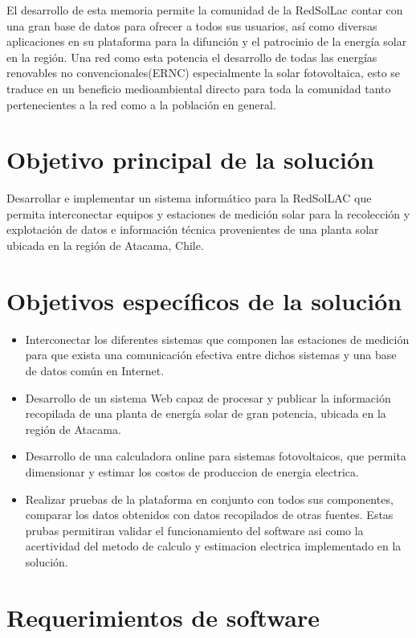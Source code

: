 El desarrollo de esta memoria permite la comunidad de la RedSolLac contar con una gran base de datos para ofrecer a todos sus usuarios, así como diversas aplicaciones en su plataforma para la difunción y el patrocinio de la energía solar en la región. Una red como esta potencia el desarrollo de todas las energías renovables no convencionales(ERNC) especialmente la solar fotovoltaica, esto se traduce en un beneficio medioambiental directo para toda la comunidad tanto pertenecientes a la red como a la población en general.

\section{Objetivo principal de la solución}
Desarrollar e implementar un sistema informático para la RedSolLAC que permita interconectar equipos y estaciones de medición solar para la recolección y explotación de datos e información técnica provenientes de una planta solar ubicada en la región de Atacama, Chile.

\section{Objetivos específicos de la solución}
\begin{itemize}
\item Interconectar los diferentes sistemas que componen las estaciones de medición para que exista una comunicación efectiva entre dichos sistemas y una base de datos común en Internet.
\item Desarrollo de un sistema Web capaz de procesar y publicar la información recopilada de una planta de energía solar de gran potencia, ubicada en la región de Atacama.
\item Desarrollo de una calculadora online para sistemas fotovoltaicos, que permita dimensionar y estimar los costos de produccion de energia electrica.
\item Realizar pruebas de la plataforma en conjunto con todos sus componentes, comparar los datos obtenidos con datos recopilados de otras fuentes. Estas prubas permitiran validar el funcionamiento del software asi como la acertividad del metodo de calculo y estimacion electrica implementado en la solución.
\end{itemize}

\section{Requerimientos de software}

